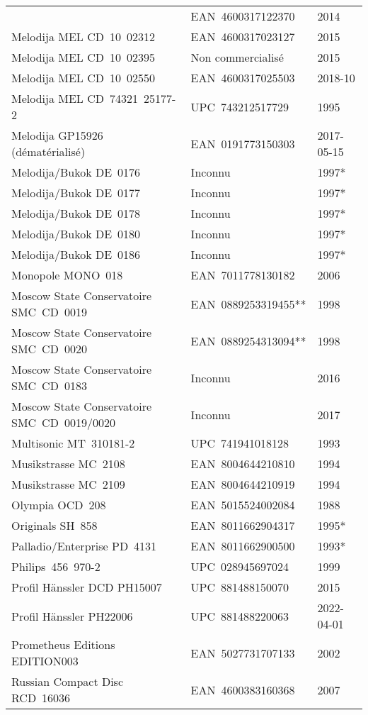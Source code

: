 {\begin{longtable}[c]{lll}
 & EAN~4600317122370
 & 2014 \\
 Melodija MEL CD~10~02312
 & EAN~4600317023127
 & 2015 \\
 Melodija MEL CD~10~02395
 & Non commercialisé
 & 2015 \\
 Melodija MEL CD~10~02550
 & EAN~4600317025503
 & 2018-10 \\
 Melodija MEL CD~74321~\hbox{25177-2}
 & UPC~743212517729
 & 1995 \\
 Melodija GP15926 (dématérialisé)
 & EAN~0191773150303
 & 2017-05-15 \\
 Melodija/Bukok DE~0176
 & Inconnu
 & 1997* \\
 Melodija/Bukok DE~0177
 & Inconnu
 & 1997* \\
 Melodija/Bukok DE~0178
 & Inconnu
 & 1997* \\
 Melodija/Bukok DE~0180
 & Inconnu
 & 1997* \\
 Melodija/Bukok DE~0186
 & Inconnu
 & 1997* \\
 Monopole MONO~018
 & EAN~7011778130182
 & 2006 \\
 Moscow State Conservatoire SMC~CD~0019
 & EAN~0889253319455**
 & 1998 \\
 Moscow State Conservatoire SMC~CD~0020
 & EAN~0889254313094**
 & 1998 \\
 Moscow State Conservatoire SMC~CD~0183
 & Inconnu
 & 2016 \\
 Moscow State Conservatoire SMC~CD~0019/0020
 & Inconnu
 & 2017 \\
 Multisonic MT~\hbox{310181-2}
 & UPC~741941018128
 & 1993 \\
 Musikstrasse MC~2108
 & EAN~8004644210810
 & 1994 \\
 Musikstrasse MC~2109
 & EAN~8004644210919
 & 1994 \\
 Olympia OCD~208
 & EAN~5015524002084
 & 1988 \\
 Originals SH~858
 & EAN~8011662904317
 & 1995* \\
 Palladio/Enterprise PD~4131
 & EAN~8011662900500
 & 1993* \\
 Philips~456~\hbox{970-2}
 & UPC~028945697024
 & 1999 \\
 Profil Hänssler DCD PH15007
 & UPC~881488150070
 & 2015 \\
 Profil Hänssler PH22006
 & UPC~881488220063
 & 2022-04-01 \\
 Prometheus Editions EDITION003
 & EAN~5027731707133
 & 2002 \\
 Russian Compact Disc RCD~16036
 & EAN~4600383160368
 & 2007 \\

\end{longtable}}
